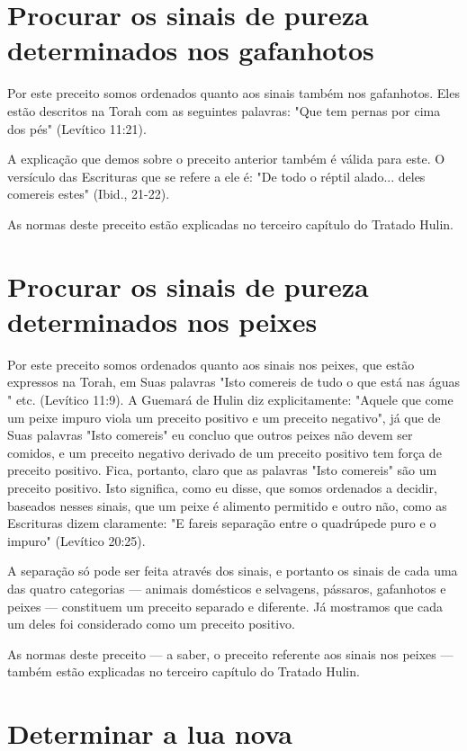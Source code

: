 \begin{itemize}
\begin{enumrate}
\begin{itemize}
\begin{itemize}
\begin{itemize}
\section{Procurar os sinais de pureza determinados nos gafanhotos}

Por este preceito somos ordenados quanto aos sinais também nos
gafanhotos. Eles estão descritos na Torah com as seguintes palavras:
"Que tem pernas por cima dos pés" (Levítico 11:21).

A explicação que demos sobre o preceito anterior também é válida para
este. O versículo das Escrituras que se refere a ele é: "De todo o
réptil alado... deles comereis estes" (Ibid., 21-22).

As normas deste preceito estão explicadas no terceiro capítulo do
Tratado Hulin.


\section{Procurar os sinais de pureza determinados nos peixes}


Por este preceito somos ordenados quanto aos sinais nos peixes, que
estão expressos na Torah, em Suas palavras "Isto comereis de tudo o que
está nas águas " etc. (Levítico 11:9). A Guemará de Hulin diz
explicitamente: "Aquele que come um peixe impuro viola um preceito
positivo e um preceito negati­vo", já que de Suas palavras "Isto
comereis" eu concluo que outros peixes não devem ser comidos, e um
preceito negativo derivado de um preceito positivo tem força de preceito
positivo. Fica, portanto, claro que as palavras "Isto co­mereis" são um
preceito positivo. Isto significa, como eu disse, que somos or­denados a
decidir, baseados nesses sinais, que um peixe é alimento permitido e
outro não, como as Escrituras dizem claramente: "E fareis separação
entre o quadrúpede puro e o impuro" (Levítico 20:25).

A separação só pode ser feita através dos sinais, e portanto os sinais
de cada uma das quatro categorias --- animais domésticos e selvagens,
pássaros, gafanhotos e peixes --- constituem um preceito separado e
diferente. Já mostra­mos que cada um deles foi considerado como um
preceito positivo.

As normas deste preceito --- a saber, o preceito referente aos sinais
nos peixes --- também estão explicadas no terceiro capítulo do Tratado
Hulin.

\section{Determinar a lua nova}


\end{itemize}
\end{itemize}
\end{itemize}
\end{enumrate}
\end{itemize}
